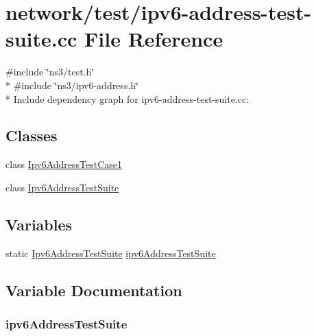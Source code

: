 \hypertarget{ipv6-address-test-suite_8cc}{}\section{network/test/ipv6-\/address-\/test-\/suite.cc File Reference}
\label{ipv6-address-test-suite_8cc}
{\ttfamily \#include \char`\"{}ns3/test.\+h\char`\"{}}\\*
{\ttfamily \#include \char`\"{}ns3/ipv6-\/address.\+h\char`\"{}}\\*
Include dependency graph for ipv6-\/address-\/test-\/suite.cc\+:
\subsection*{Classes}
\begin{DoxyCompactItemize}
\item 
class \hyperlink{classIpv6AddressTestCase1}{Ipv6\+Address\+Test\+Case1}
\item 
class \hyperlink{classIpv6AddressTestSuite}{Ipv6\+Address\+Test\+Suite}
\end{DoxyCompactItemize}
\subsection*{Variables}
\begin{DoxyCompactItemize}
\item 
static \hyperlink{classIpv6AddressTestSuite}{Ipv6\+Address\+Test\+Suite} \hyperlink{ipv6-address-test-suite_8cc_abfbc507e4c62ae3cccd34d3ae4870768}{ipv6\+Address\+Test\+Suite}
\end{DoxyCompactItemize}


\subsection{Variable Documentation}
\subsubsection[{\texorpdfstring{ipv6\+Address\+Test\+Suite}{ipv6AddressTestSuite}}]{ ipv6\+Address\+Test\+Suite\hspace{0.3cm}{\ttfamily [static]}}\hypertarget{ipv6-address-test-suite_8cc_abfbc507e4c62ae3cccd34d3ae4870768}{}\label{ipv6-address-test-suite_8cc_abfbc507e4c62ae3cccd34d3ae4870768}
